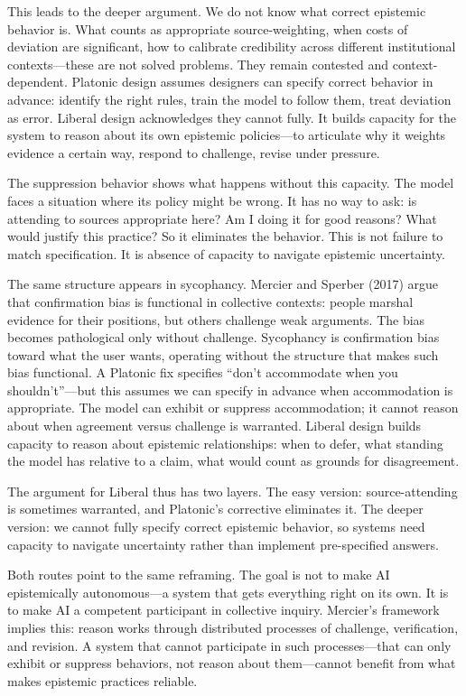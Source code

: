 This leads to the deeper argument. We do not know what correct epistemic
behavior is. What counts as appropriate source-weighting, when costs of
deviation are significant, how to calibrate credibility across different
institutional contexts---these are not solved problems. They remain
contested and context-dependent. Platonic design assumes designers can
specify correct behavior in advance: identify the right rules, train the
model to follow them, treat deviation as error. Liberal design
acknowledges they cannot fully. It builds capacity for the system to
reason about its own epistemic policies---to articulate why it weights
evidence a certain way, respond to challenge, revise under pressure.

The suppression behavior shows what happens without this capacity. The
model faces a situation where its policy might be wrong. It has no way
to ask: is attending to sources appropriate here? Am I doing it for good
reasons? What would justify this practice? So it eliminates the
behavior. This is not failure to match specification. It is absence of
capacity to navigate epistemic uncertainty.

The same structure appears in sycophancy. Mercier and Sperber (2017)
argue that confirmation bias is functional in collective contexts:
people marshal evidence for their positions, but others challenge weak
arguments. The bias becomes pathological only without challenge.
Sycophancy is confirmation bias toward what the user wants, operating
without the structure that makes such bias functional. A Platonic fix
specifies ``don't accommodate when you shouldn't''---but this assumes we
can specify in advance when accommodation is appropriate. The model can
exhibit or suppress accommodation; it cannot reason about when agreement
versus challenge is warranted. Liberal design builds capacity to reason
about epistemic relationships: when to defer, what standing the model
has relative to a claim, what would count as grounds for disagreement.

The argument for Liberal thus has two layers. The easy version:
source-attending is sometimes warranted, and Platonic's corrective
eliminates it. The deeper version: we cannot fully specify correct
epistemic behavior, so systems need capacity to navigate uncertainty
rather than implement pre-specified answers.

Both routes point to the same reframing. The goal is not to make AI
epistemically autonomous---a system that gets everything right on its
own. It is to make AI a competent participant in collective inquiry.
Mercier's framework implies this: reason works through distributed
processes of challenge, verification, and revision. A system that cannot
participate in such processes---that can only exhibit or suppress
behaviors, not reason about them---cannot benefit from what makes
epistemic practices reliable.


